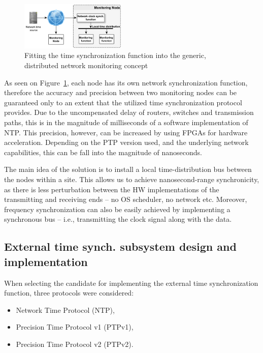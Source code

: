 \documentclass[journal]{IEEEtran}
\begin{document}
\begin{figure}[!htb]
    \centering
    \includegraphics[width=0.45\textwidth]{figures_raw/concept.png}
    \caption{Fitting the time synchronization function into the generic, distributed network monitoring concept}
    \label{fig:concept}
\end{figure}

As seen on Figure~\ref{fig:concept}, each node has its own network synchronization function, therefore the accuracy and
precision between two monitoring nodes can be guaranteed only to an extent that the utilized time synchronization
protocol provides. Due to the uncompensated delay of routers, switches and transmission paths, this is in the magnitude of milliseconds of a software implementation of NTP. This precision, however, can be increased by using FPGAs for hardware acceleration. Depending on the PTP version used, and the underlying network capabilities, this can be fall into the magnitude of nanoseconds.

The main idea of the solution is to install a local time-distribution bus between the nodes within a site. This allows us to achieve nanosecond-range synchronicity, as there is
less perturbation between the HW implementations of the transmitting and receiving ends -- no OS scheduler, no network etc. Moreover, frequency synchronization can also be easily achieved by implementing a synchronous bus -- i.e., transmitting
the
clock signal along with the data.

\subsection{External time synch. subsystem design and implementation}\label{sec:External-Impl}

When selecting the candidate for implementing the external time synchronization function,
three protocols were considered:
\begin{itemize}
    \item Network Time Protocol (NTP),
    \item Precision Time Protocol v1 (PTPv1),
    \item Precision Time Protocol v2 (PTPv2).
\end{itemize}
\end{document}
